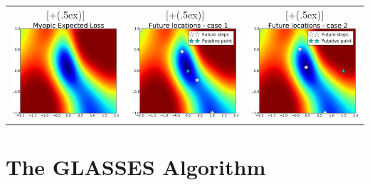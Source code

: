 \documentclass[twoside]{article}
\newcommand*{\addheight}[2][.5ex]{%
  \raisebox{0pt}[\dimexpr\height+(#1)\relax]{#2}%
}
\begin{document}
\begin{table}[t!]
\begin{tabular}{ccc}
      \addheight{\includegraphics[width=54mm]{bo_1step.pdf}} &
      \addheight{\includegraphics[width=54mm]{predicted_locations1.pdf}}  &
      \addheight{\includegraphics[width=54mm]{predicted_locations2.pdf}}
\end{tabular}
\end{table}

 \section{The GLASSES Algorithm}\label{sec:glasses}
\end{document}
